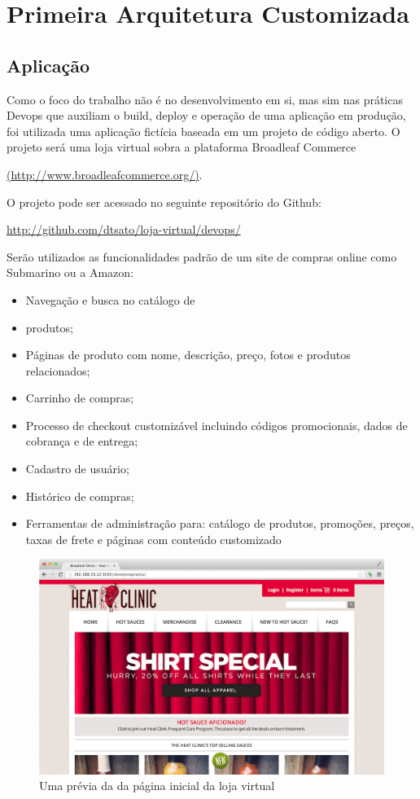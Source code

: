 \section{Primeira Arquitetura Customizada}

\subsection{Aplicação}

Como o foco do trabalho não é no desenvolvimento em si, mas sim nas práticas Devops que auxiliam o build, deploy e operação de uma aplicação em produção, foi utilizada uma aplicação fictícia baseada em um projeto de código aberto. O projeto será uma loja virtual sobra a plataforma Broadleaf Commerce 

\url {(http://www.broadleafcommerce.org/)}. 

O projeto pode ser acessado no seguinte repositório do Github: 

\url {http://github.com/dtsato/loja-virtual/devops/}

Serão utilizados as funcionalidades padrão de um site de compras online como Submarino ou a Amazon:

\begin{itemize}

\item Navegação e busca no catálogo de \item produtos;
\item Páginas de produto com nome, descrição, preço, fotos e produtos relacionados;
\item Carrinho de compras;
\item Processo de checkout customizável incluindo códigos promocionais, dados de cobrança e de entrega;
\item Cadastro de usuário;
\item Histórico de compras;
\item Ferramentas de administração para: catálogo de produtos, promoções, preços, taxas de frete e páginas com conteúdo customizado


\end{itemize}

\begin {figure} [!htb]
\centering
\includegraphics[scale=0.5]{imagens/label_loja}
\caption{Uma prévia da da página inicial da loja virtual}

\end{figure}

